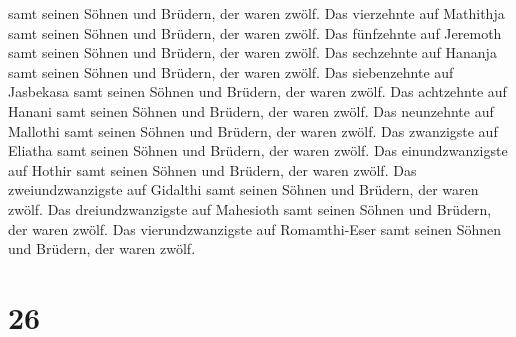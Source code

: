 samt seinen Söhnen und Brüdern, der waren zwölf.  Das
vierzehnte auf Mathithja samt seinen Söhnen und Brüdern, der waren
zwölf.  Das fünfzehnte auf Jeremoth samt seinen Söhnen und
Brüdern, der waren zwölf.  Das sechzehnte auf Hananja samt
seinen Söhnen und Brüdern, der waren zwölf.  Das
siebenzehnte auf Jasbekasa samt seinen Söhnen und Brüdern, der waren
zwölf.  Das achtzehnte auf Hanani samt seinen Söhnen und
Brüdern, der waren zwölf.  Das neunzehnte auf Mallothi samt
seinen Söhnen und Brüdern, der waren zwölf.  Das zwanzigste
auf Eliatha samt seinen Söhnen und Brüdern, der waren zwölf.
 Das einundzwanzigste auf Hothir samt seinen Söhnen und
Brüdern, der waren zwölf.  Das zweiundzwanzigste auf
Gidalthi samt seinen Söhnen und Brüdern, der waren zwölf. 
Das dreiundzwanzigste auf Mahesioth samt seinen Söhnen und Brüdern, der
waren zwölf.  Das vierundzwanzigste auf Romamthi-Eser samt
seinen Söhnen und Brüdern, der waren zwölf.

\hypertarget{section-25}{%
\section{26}\label{section-25}}

